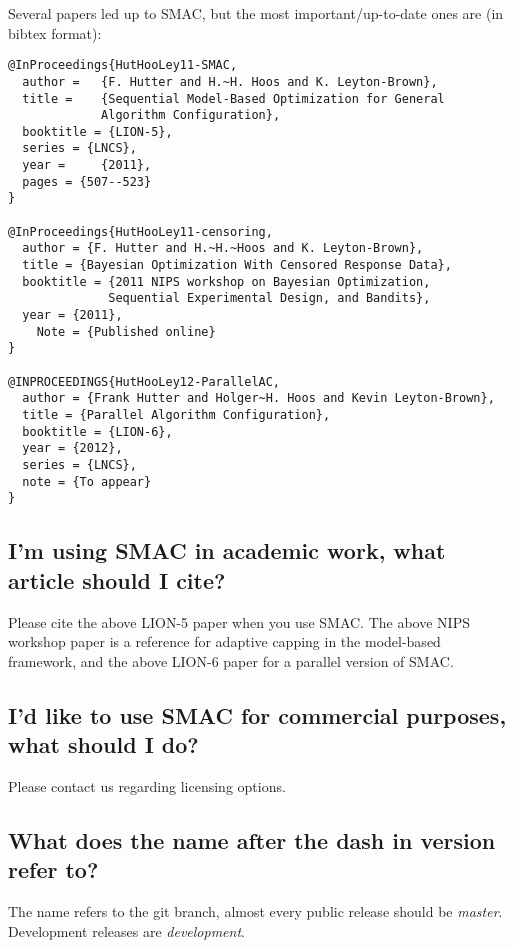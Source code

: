 \documentclass[11pt,letterpaper,oneside]{article}
\begin{document}
Several papers led up to SMAC, but the most important/up-to-date ones are (in bibtex format):
\begin{verbatim}
@InProceedings{HutHooLey11-SMAC,
  author =	 {F. Hutter and H.~H. Hoos and K. Leyton-Brown},
  title =	 {Sequential Model-Based Optimization for General 
             Algorithm Configuration},
  booktitle = {LION-5},
  series = {LNCS},
  year =	 {2011},
  pages = {507--523}
}

@InProceedings{HutHooLey11-censoring,
  author = {F. Hutter and H.~H.~Hoos and K. Leyton-Brown},
  title = {Bayesian Optimization With Censored Response Data},
  booktitle = {2011 NIPS workshop on Bayesian Optimization, 
              Sequential Experimental Design, and Bandits},
  year = {2011},
	Note = {Published online}
}

@INPROCEEDINGS{HutHooLey12-ParallelAC,
  author = {Frank Hutter and Holger~H. Hoos and Kevin Leyton-Brown},
  title = {Parallel Algorithm Configuration},
  booktitle = {LION-6},
  year = {2012},
  series = {LNCS},
  note = {To appear}
}
\end{verbatim}



\subsection{I'm using SMAC in academic work, what article should I cite?}

Please cite the above LION-5 paper when you use SMAC.
The above NIPS workshop paper is a reference for adaptive capping in the model-based framework, and the above LION-6 paper for a parallel version of SMAC.

\subsection{I'd like to use SMAC for commercial purposes, what should I do?}

Please contact us regarding licensing options.
	
\subsection{What does the name after the dash in version refer to?}

	The name refers to the git branch, almost every public release should be \textit{master}. Development releases are \textit{development}. 
\end{document}

